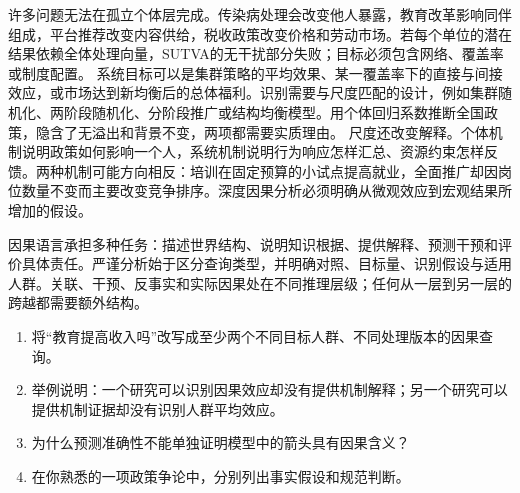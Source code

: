 许多问题无法在孤立个体层完成。传染病处理会改变他人暴露，教育改革影响同伴组成，平台推荐改变内容供给，税收政策改变价格和劳动市场。若每个单位的潜在结果依赖全体处理向量，SUTVA的无干扰部分失败；目标必须包含网络、覆盖率或制度配置。
系统目标可以是集群策略的平均效果、某一覆盖率下的直接与间接效应，或市场达到新均衡后的总体福利。识别需要与尺度匹配的设计，例如集群随机化、两阶段随机化、分阶段推广或结构均衡模型。用个体回归系数推断全国政策，隐含了无溢出和背景不变，两项都需要实质理由。
尺度还改变解释。个体机制说明政策如何影响一个人，系统机制说明行为响应怎样汇总、资源约束怎样反馈。两种机制可能方向相反：培训在固定预算的小试点提高就业，全面推广却因岗位数量不变而主要改变竞争排序。深度因果分析必须明确从微观效应到宏观结果所增加的假设。

\begin{chapterreview}
因果语言承担多种任务：描述世界结构、说明知识根据、提供解释、预测干预和评价具体责任。严谨分析始于区分查询类型，并明确对照、目标量、识别假设与适用人群。关联、干预、反事实和实际因果处在不同推理层级；任何从一层到另一层的跨越都需要额外结构。
\end{chapterreview}

\begin{selfcheck}
\begin{enumerate}
  \item 将“教育提高收入吗”改写成至少两个不同目标人群、不同处理版本的因果查询。
  \item 举例说明：一个研究可以识别因果效应却没有提供机制解释；另一个研究可以提供机制证据却没有识别人群平均效应。
  \item 为什么预测准确性不能单独证明模型中的箭头具有因果含义？
  \item 在你熟悉的一项政策争论中，分别列出事实假设和规范判断。
\end{enumerate}
\end{selfcheck}

